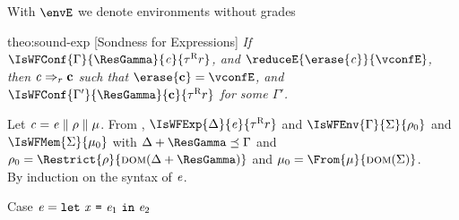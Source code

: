 With $\envE$ we denote environments without grades

\begin{proofOf}{theo:sound-exp} [Sondness for Expressions] {\em If $\IsWFConf{\Gamma}{\ResGamma}{\conf}{\Graded{\tau}{\Rgr}{\rgr}}$, and
$\reduceE{\erase{\conf}}{\vconfE}$, then $\mathit{c}\Rightarrow_{r}\mathbf{c}$ such that $\erase{\vconf}=\vconfE$, and $\IsWFConf{\Gamma'}{\ResGamma}{\vconf}{\Graded{\tau}{\Rgr}{\rgr}}$ for some $\Gamma'$.
}

\smallskip\noindent
Let $\mathit{c}=\mathit{e}\parallel\rho\parallel\mu$. From , $\IsWFExp{\Delta}{\e}{\Graded{\tau}{\Rgr}{\rgr}}$ and 
$\IsWFEnv{\Gamma}{\Sigma}{\env_0}$ and $\IsWFMem{\Sigma}{\mem_0}$ with $\Delta\ctxsum\ResGamma\ctxord\Gamma$ and
 $\env_0=\Restrict{\env}{\dom{\Delta\ctxsum\ResGamma}}$ and $\mem_0=\From{\mem}{\dom{\Sigma}}$.\\
By induction on the syntax of $\mathit{e}$. 
\begin{description}
\item [Case $\mathit{e}=\texttt{let}\ \mathit{x}\ \texttt{=}\ \mathit{e}_1\ \texttt{in}\ \mathit{e}_2$]\


\end{description}
\end{proofOf}
